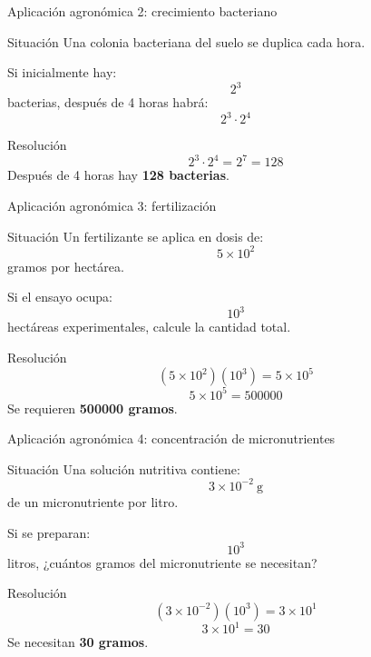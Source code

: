 \documentclass[aspectratio=169,10pt,handout]{beamer}
\newcommand{\pp}{\pause}
\begin{document}
	\begin{frame}{Aplicación agronómica 2: crecimiento bacteriano}
		\begin{block}{Situación}
			Una colonia bacteriana del suelo se duplica cada hora.
			
			Si inicialmente hay:
			\[
			2^3
			\]
			bacterias, después de 4 horas habrá:
			\[
			2^3\cdot2^4
			\]
		\end{block}
		
		\pp
		
		\begin{exampleblock}{Resolución}
			\[
			2^3\cdot2^4=2^{7}=128
			\]
			Después de 4 horas hay \textbf{128 bacterias}.
		\end{exampleblock}
	\end{frame}
	
	\begin{frame}{Aplicación agronómica 3: fertilización}
		\begin{block}{Situación}
			Un fertilizante se aplica en dosis de:
			\[
			5\times10^2
			\]
			gramos por hectárea.
			
			Si el ensayo ocupa:
			\[
			10^3
			\]
			hectáreas experimentales, calcule la cantidad total.
		\end{block}
		
		\pp
		
		\begin{exampleblock}{Resolución}
			\[
			(5\times10^2)(10^3)=5\times10^5
			\]
			\[
			5\times10^5=500000
			\]
			Se requieren \textbf{500000 gramos}.
		\end{exampleblock}
	\end{frame}
	
	\begin{frame}{Aplicación agronómica 4: concentración de micronutrientes}
		\begin{block}{Situación}
			Una solución nutritiva contiene:
			\[
			3\times10^{-2}\ \text{g}
			\]
			de un micronutriente por litro.
			
			Si se preparan:
			\[
			10^3
			\]
			litros, ¿cuántos gramos del micronutriente se necesitan?
		\end{block}
		
		\pp
		
		\begin{exampleblock}{Resolución}
			\[
			(3\times10^{-2})(10^3)=3\times10^{1}
			\]
			\[
			3\times10^1=30
			\]
			Se necesitan \textbf{30 gramos}.
		\end{exampleblock}
	\end{frame}
	
\end{document}
